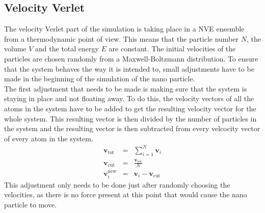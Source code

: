 \documentclass[12pt]{article}
\begin{document}
\subsection{Velocity Verlet}
The velocity Verlet part of the simulation is taking place in a NVE ensemble from a thermodynamic point of view. 
This means that the particle number $N$, the volume $V$ and the total energy $E$ are constant. 
The initial velocities of the particles are chosen randomly from a Maxwell-Boltzmann distribution. To ensure that the system behaves the way it is
intended to, small adjustments have to be made in the beginning of the simulation of the nano particle.\\
The first adjustment that needs to be made is making sure that the system is staying in place and not floating away. To do this, the velocity vectors
of all the atoms in the system have to be added to get the resulting velocity vector for the whole system. 
This resulting vector is then divided by the number of particles in the system and the resulting vector is then subtracted from every
velcocity vector of every atom in the system. 
\begin{eqnarray}
    \mathbf{v}_\text{tot} &=& \sum_{i=1}^N \mathbf{v}_i\\
    \mathbf{v}_\text{cut} &=& \frac{\mathbf{v}_\text{tot}}N\\
    \mathbf{v}_i^\text{new} &=& \mathbf{v}_i - \mathbf{v}_\text{cut}
\end{eqnarray}
This adjustment only needs to be done just after randomly choosing the velocities, as there is no force present at this point that would cause the
nano particle to move.
\end{document}
